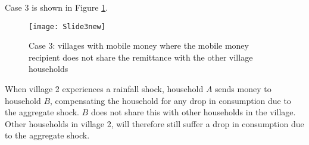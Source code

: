 Case 3 is shown in Figure \ref{fig:link2}.
\begin{figure}[p]
    \centering
\texttt{[image: Slide3new]} 
\caption{Case 3: villages with mobile money where the mobile money recipient does not share the remittance with the other village households }
    \label{fig:link2}
\end{figure}
When village 2 experiences a rainfall shock, household $A$ sends money to household $B$, compensating the household for any drop in consumption due to the aggregate shock. $B$ does not share this with other households in the village. Other households in village 2, will therefore still suffer a drop in consumption due to the aggregate shock.



